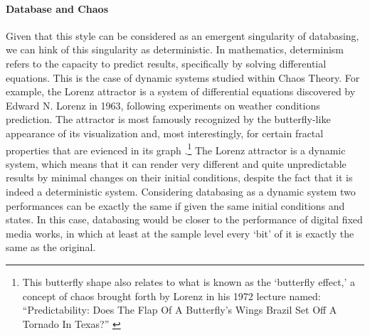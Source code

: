 \paragraph{Database and Chaos}
Given that this style can be considered as an emergent singularity of databasing, we can hink of this singularity as deterministic. In mathematics, determinism refers to the capacity to predict results, specifically by solving differential equations. This is the case of dynamic systems studied within Chaos Theory. For example, the Lorenz attractor is a system of differential equations discovered by Edward N. Lorenz in 1963, following experiments on weather conditions prediction. The attractor is most famously recognized by the butterfly-like appearance of its visualization and, most interestingly, for certain fractal properties that are evienced in its graph .\footnote{This butterfly shape also relates to what is known as the `butterfly effect,' a concept of chaos brought forth by Lorenz in his 1972 lecture named: ``Predictability: Does The Flap Of A Butterfly's Wings Brazil Set Off A Tornado In Texas?'' \parencite[181]{Lor93:Ess}} The Lorenz attractor is a dynamic system, which means that it can render very different and quite unpredictable results by minimal changes on their initial conditions, despite the fact that it is indeed a deterministic system. Considering databasing as a dynamic system two performances can be exactly the same if given the same initial conditions and states. In this case, databasing would be closer to the performance of digital fixed media works, in which at least at the sample level every `bit' of it is exactly the same as the original. 


